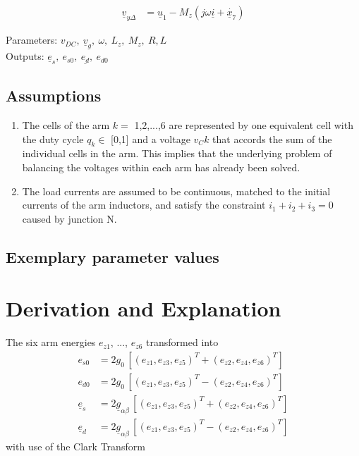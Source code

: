 \documentclass[10pt,a4paper]{article}
\begin{document}
	\begin{align}
		\underline{v}_{y\Delta} &= \underline{u}_1 - M_z (j\omega \underline{i} + \dot{\underline{x}_7})
	\end{align}

	\noindent
	Parameters: $v_{DC}, \ \underline{v}_g, \ \omega, \ L_z, \ M_z, \ R,L$
	\\
	Outputs: $\underline{e}_s, \ e_{s0}, \ \underline{e_d}, \ e_{d0}$
	
	
	\subsection{Assumptions}	
	\begin{enumerate}
		\item The cells of the arm $k=$ 1,2,...,6 are represented by one equivalent cell with the duty cycle $q_k \in$ [0,1] and a voltage $v_Ck$ that accords the sum of the individual cells in the arm. This implies that the
		underlying problem of balancing the voltages within each
		arm has already been solved.
		\item The load currents are assumed to be continuous, matched
		to the initial currents of the arm inductors, and satisfy the
		constraint $i_1 + i_2 + i_3 = 0$ caused by junction N.
	\end{enumerate}
	
	
	\subsection{Exemplary parameter values}
	

			
	\section{Derivation and Explanation} 
	The six arm energies $e_{z1}$, ..., $e_{z6}$ transformed into  
	\begin{subequations}	
	\begin{align}
		e_{s0} &= 2g_0 \, [(e_{z1},e_{z3},e_{z5})^T+(e_{z2},e_{z4},e_{z6})^T] 	\\
		e_{d0} &=2g_0 \, [(e_{z1},e_{z3},e_{z5})^T-(e_{z2},e_{z4},e_{z6})^T]	\\
		\underline{e}_s &=2\underline{g}_{\alpha\beta} \, [(e_{z1},e_{z3},e_{z5})^T+(e_{z2},e_{z4},e_{z6})^T]	\\
		\underline{e}_d &=2\underline{g}_{\alpha\beta} \, [(e_{z1},e_{z3},e_{z5})^T-(e_{z2},e_{z4},e_{z6})^T]
	\end{align}	
	\end{subequations}
	with use of the Clark Transform
	
\end{document}
